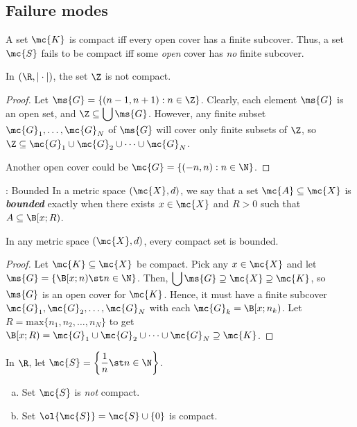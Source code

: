 \subsection*{Failure modes}
A set \(\mc{K}\) is compact iff every open cover has a finite subcover. Thus, a set \(\mc{S}\) fails to be compact iff some \emph{open} cover has \emph{no} finite subcover.

\begin{nlemma}{}
	In \((\R,|\cdot|)\), the set \(\Z\) is not compact.
\end{nlemma}
\begin{proof}
	Let \(\ms{G}=\{(n-1,n+1):n\in\Z\}\). Clearly, each element \(\ms{G}\) is an open set, and \(\Z\subseteq\displaystyle\bigcup\ms{G}\). However, any finite subset \(\mc{G}_1,\dots,\mc{G}_N\) of \(\ms{G}\) will cover only finite subsets of \(\Z\), so \(\Z\subseteq\mc{G}_1\cup \mc{G}_2\cup \dots\cup \mc{G}_N\).
	
	\medskip
	
	Another open cover could be \(\mc{G}=\{(-n,n):n\in\N\}\).
\end{proof}

\begin{ndef}{: Bounded}
	In a  metric space \((\mc{X},d)\), we say that a set \(\mc{A}\subseteq\mc{X}\) is \emph{\textbf{bounded}} exactly when there exists \(x\in\mc{X}\) and \(R>0\) such that \(A\subseteq\B[x;R)\).
\end{ndef}
\begin{nproposition}{}
	In any metric space \((\mc{X},d)\), every compact set is bounded.
\end{nproposition}
\begin{proof}
	Let \(\mc{K}\subseteq\mc{X}\) be compact. Pick any \(x\in\mc{X}\) and let \(\ms{G}=\{\B[x;n)\st n\in\N\}\). Then, \(\displaystyle\bigcup\ms{G}\supseteq\mc{X}\supseteq\mc{K}\), so \(\ms{G}\) is an open cover for \(\mc{K}\). Hence, it must have a finite subcover \(\mc{G}_1,\mc{G}_2,\dots,\mc{G}_N\) with each \(\mc{G}_k=\B[x;n_k)\). Let \(R=\text{max}\{n_1,n_2,\dots,n_N\}\) to get \(\B[x;R)=\mc{G}_1\cup\mc{G}_2\cup\dots\cup \mc{G}_N\supseteq\mc{K}\).
\end{proof}

\begin{nlemma}{}
	In \(\R\), let \(\mc{S}=\displaystyle\left\{\displaystyle\frac{1}{n}\st n\in\N\right\}\).
	\begin{enumerate}[(a)]
		\item Set \(\mc{S}\) is \emph{not} compact.
		
		\item Set \(\ol{\mc{S}}=\mc{S}\cup\{0\}\) is compact.  
	\end{enumerate}
\end{nlemma}

